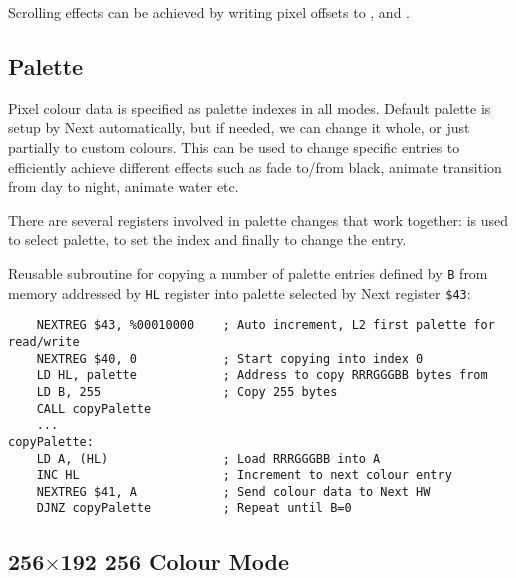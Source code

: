 Scrolling effects can be achieved by writing pixel offsets to ,  and .


\subsection{Palette}

Pixel colour data is specified as palette indexes in all modes. Default palette is setup by Next automatically, but if needed, we can change it whole, or just partially to custom colours. This can be used to change specific entries to efficiently achieve different effects such as fade to/from black, animate transition from day to night, animate water etc.

There are several registers involved in palette changes that work together:  is used to select palette,  to set the index and finally  to change the entry.

Reusable subroutine for copying a number of palette entries defined by {\tt B} from memory addressed by {\tt HL} register into palette selected by Next register {\tt \$43}:

\begin{lstlisting}
    NEXTREG $43, %00010000    ; Auto increment, L2 first palette for read/write
    NEXTREG $40, 0            ; Start copying into index 0
    LD HL, palette            ; Address to copy RRRGGGBB bytes from
    LD B, 255                 ; Copy 255 bytes
    CALL copyPalette
    ...
copyPalette:
    LD A, (HL)                ; Load RRRGGGBB into A
    INC HL                    ; Increment to next colour entry
    NEXTREG $41, A            ; Send colour data to Next HW
    DJNZ copyPalette          ; Repeat until B=0
\end{lstlisting}


\pagebreak
\subsection{256$\times$192 256 Colour Mode}


